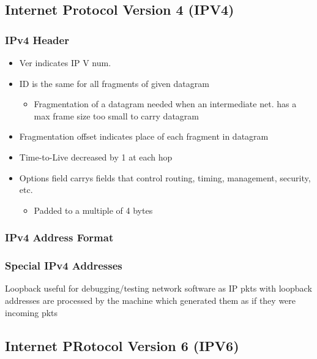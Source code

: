 \documentclass[a4paper]{article}
\begin{document}
\subsection{Internet Protocol Version 4 (IPV4)}
\subsubsection{IPv4 Header}
\begin{itemize}
	\item Ver indicates IP V num.
	\item ID is the same for all fragments of given datagram
	\begin{itemize}
		\item Fragmentation of a datagram needed when an intermediate
			net. has a max frame size too small to carry datagram
	\end{itemize}
	\item Fragmentation offset indicates place of each fragment in datagram
	\item Time-to-Live decreased by 1 at each hop
	\item Options field carrys fields that control routing, timing,
		management, security, etc.
	\begin{itemize}
		\item Padded to a multiple of 4 bytes
	\end{itemize}
\end{itemize}
\subsubsection{IPv4 Address Format}
\subsubsection{Special IPv4 Addresses}
Loopback useful for debugging/testing network software as IP pkts with loopback
addresses are processed by the machine which generated them as if they were
incoming pkts
\subsection{Internet PRotocol Version 6 (IPV6)}
\end{document}
